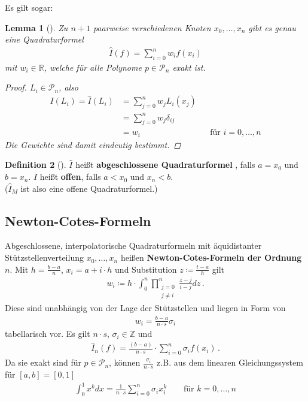 \documentclass[ngerman,fontsize=11pt, paper=a4, parskip=half, titlepage=true, toc=bib]{scrbook}
\theoremstyle{definition}
\newtheorem{Def}{Definition}[section]		%
\theoremstyle{plain}
\newtheorem{Lem}[Def]{Lemma}		%
\newcommand{\R}{\mathds{R}}
\newcommand{\Z}{\mathds{Z}}
\newcommand{\subsectione}[1]{\addtocounter{Def}{1}\subsection{#1}}
\newenvironment{Leme}[1][]{ %
  \begin{Lem}[#1] }
  {\end{Lem}
  \addtocounter{subsection}{1}}
\newenvironment{Defe}[1][]{ %
  \begin{Def}[#1]}
  {\end{Def}
  \addtocounter{subsection}{1}}
\begin{document}
Es gilt sogar:
\begin{Leme}\label{7.2.1}
  Zu $n+1$ paarweise verschiedenen Knoten $x_0,\dots, x_n$
  gibt es genau eine Quadraturformel
  \begin{gather*}
    \hat{I}(f) = \sum_{i=0}^nw_if(x_i)
  \end{gather*}
  mit $w_i\in\R$, welche für alle Polynome $p\in\mathcal{P}_n$ exakt ist.

  \begin{proof}
    $L_i\in\mathcal{P}_n$, also 
    \begin{align*}
      I(L_i)=\hat{I}(L_i)&=\sum_{j=0}^{n}w_jL_i(x_j)\\
                         &=\sum_{j=0}^{n}w_j\delta_{ij}\\
                         &=w_i && \text{für } i=0,\dots,n
    \end{align*}
    Die Gewichte sind damit eindeutig bestimmt.
  \end{proof}
\end{Leme}

\begin{Defe}\label{7.2.2}
  $\hat{I}$ heißt \textbf{abgeschlossene Quadraturformel}
  ,
  falls $a=x_0$ und $b=x_n$.
  $\hat{I}$ heißt \textbf{offen}, falls $a<x_0$ und $x_n<b$.\\
  ($\hat{I}_M$ ist also eine offene Quadraturformel.)
\end{Defe}

\subsectione{Newton-Cotes-Formeln}
Abgeschlossene, interpolatorische Quadraturformeln mit
äquidistanter Stützstellenverteilung $x_0, \dots, x_n$ heißen
\textbf{Newton-Cotes-Formeln der Ordnung $n$}.
Mit $h=\frac{b-a}{n}$, $x_i=a+i\cdot h$ und Substitution
$z\coloneqq \frac{t-a}{h}$ gilt
\begin{gather}
  w_i\coloneqq h
  \cdot \int_0^n \prod_{\substack{j=0\\j\neq i}}^n\frac{z-j}{i-j}dz\, .
  \label{VII.2.3}
\end{gather}
Diese sind unabhängig von der Lage der Stützstellen
und liegen in Form von
\begin{gather*}
  w_i=\frac{b-a}{n\cdot s}\sigma_i
\end{gather*}
tabellarisch vor.  Es gilt $n\cdot s$, $\sigma_i\in\Z$ und
\begin{gather}
  \hat{I}_n(f) = \frac{(b-a)}{n\cdot s}
  \cdot \sum_{i=0}^{n}\sigma_i f(x_i)\,.
  \label{VII.2.4}
\end{gather}
Da sie exakt sind für $p\in \mathcal{P}_n$,
können $\frac{\sigma_i}{n\cdot s}$ z.B. aus dem
linearen Gleichungssystem für $[a,b]=[0,1]$
\begin{gather*}
  \int_0^1x^kdx=\frac{1}{n\cdot s}\sum_{i=0}^{n}\sigma_ix_i^k
  \qquad \text{für } k=0,\dots,n
\end{gather*}
\end{document}
